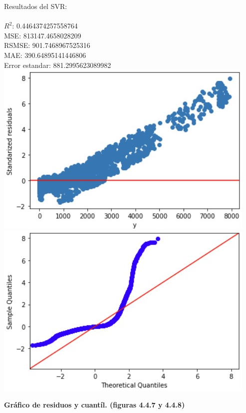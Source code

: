\documentclass{article}
\begin{document}
                
            Resultados del SVR:\\
                    \\
                        $R^2$:  0.4464374257558764 \\
                        MSE:  813147.4658028209 \\
                        RSMSE:  901.7468967525316 \\
                        MAE:  390.64895141446806 \\
                        Error estandar:  881.2995623089982 \\
                
                        \includegraphics[scale=0.6]{images/SVR_After_DS.jpg} 
                        \includegraphics[scale=0.6]{images/SVR_After_DS_Q.jpg}
                        \begin{center}
                            \textbf{Gráfico de residuos y cuantíl. (figuras 4.4.7 y 4.4.8)}
                        \end{center}
                        
\end{document}
